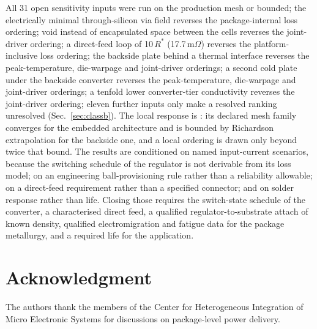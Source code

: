 \documentclass[journal]{IEEEtran}
\begin{document}
All 31 open sensitivity inputs were run on the production mesh or bounded; the electrically minimal through-silicon via field reverses the package-internal loss ordering; void instead of encapsulated space between the cells reverses the joint-driver ordering; a direct-feed loop of 10\,$R^{*}$ (17.7\,m$\Omega$) reverses the platform-inclusive loss ordering; the backside plate behind a thermal interface reverses the peak-temperature, die-warpage and joint-driver orderings; a second cold plate under the backside converter reverses the peak-temperature, die-warpage and joint-driver orderings; a tenfold lower converter-tier conductivity reverses the joint-driver ordering; eleven further inputs only make a resolved ranking unresolved (Sec.~\ref{sec:classb}). The local response is \LocalMeshPhrase{}: its declared mesh family converges for the embedded architecture and is bounded by Richardson extrapolation for the backside one, and a
local ordering is drawn only beyond twice that bound. The results are conditioned on named
input-current scenarios, because the switching schedule of the regulator is not derivable from its
loss model; on an engineering ball-provisioning rule rather than a reliability allowable; on a
direct-feed requirement rather than a specified connector; and on solder response rather than
life. Closing those requires the switch-state schedule of the converter, a characterised direct
feed, a qualified regulator-to-substrate attach of known density, qualified electromigration and
fatigue data for the package metallurgy, and a required life for the application.

\section*{Acknowledgment}
The authors thank the members of the Center for Heterogeneous Integration of Micro Electronic
Systems for discussions on package-level power delivery.



\end{document}
